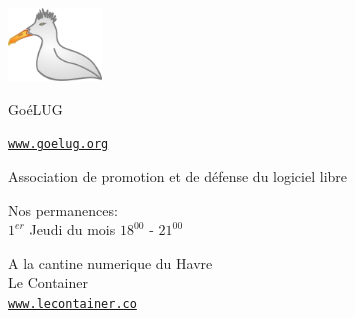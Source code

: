 \includegraphics[width=2.5cm]{goeland}

\vspace{18pt}

\huge

Go\'{e}LUG


\normalsize

\href{http://www.goelug.org}{\tt www.goelug.org}

\vspace{18pt}

Association de promotion et de d\'{e}fense du logiciel libre

\vspace{42pt}

\textsf{Nos permanences:} \\[11pt]
$ 1^{er} $ Jeudi du mois $ 18^{00} $ - $ 21^{00} $ \\

\vspace{34pt}

A la cantine numerique du Havre \\
Le Container \\
\href{http://www.lecontainer.co}{\tt www.lecontainer.co}